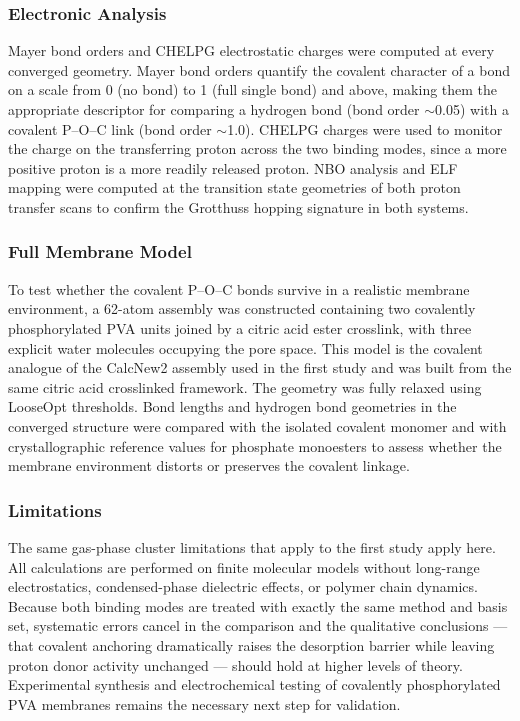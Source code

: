 \documentclass[12pt,a4paper]{report}
\begin{document}
\subsubsection{Electronic Analysis}

Mayer bond orders and CHELPG electrostatic charges were 
computed at every converged geometry. Mayer bond orders 
quantify the covalent character of a bond on a scale from 
0 (no bond) to 1 (full single bond) and above, making 
them the appropriate descriptor for comparing a hydrogen 
bond (bond order $\sim$0.05) with a covalent P--O--C link 
(bond order $\sim$1.0). CHELPG charges were used to 
monitor the charge on the transferring proton across the 
two binding modes, since a more positive proton is a more 
readily released proton. NBO analysis and ELF mapping 
were computed at the transition state geometries of both 
proton transfer scans to confirm the Grotthuss hopping 
signature in both systems.

\subsubsection{Full Membrane Model}

To test whether the covalent P--O--C bonds survive in a 
realistic membrane environment, a 62-atom assembly was 
constructed containing two covalently phosphorylated PVA 
units joined by a citric acid ester crosslink, with three 
explicit water molecules occupying the pore space. This 
model is the covalent analogue of the CalcNew2 assembly 
used in the first study and was built from the same 
citric acid crosslinked framework. The geometry was 
fully relaxed using LooseOpt thresholds. Bond lengths and 
hydrogen bond geometries in the converged structure were 
compared with the isolated covalent monomer and with 
crystallographic reference values for phosphate monoesters 
to assess whether the membrane environment distorts or 
preserves the covalent linkage.

\subsubsection{Limitations}

The same gas-phase cluster limitations that apply to the 
first study apply here. All calculations are performed on 
finite molecular models without long-range electrostatics, 
condensed-phase dielectric effects, or polymer chain 
dynamics. Because both binding modes are treated with 
exactly the same method and basis set, systematic errors 
cancel in the comparison and the qualitative conclusions 
— that covalent anchoring dramatically raises the 
desorption barrier while leaving proton donor activity 
unchanged — should hold at higher levels of theory. 
Experimental synthesis and electrochemical testing of 
covalently phosphorylated PVA membranes remains the 
necessary next step for validation.
\end{document}
